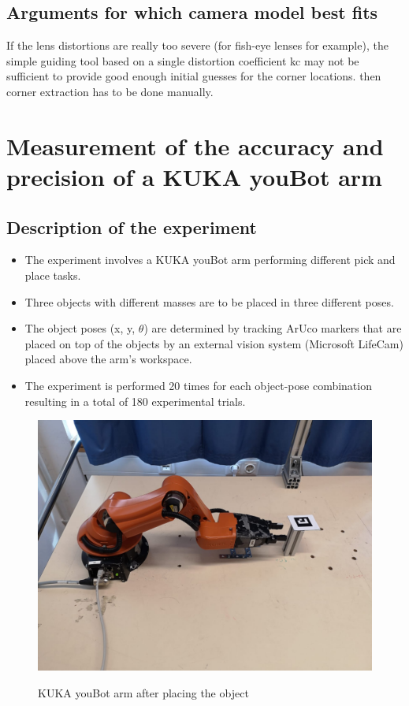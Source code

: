 \documentclass[11pt,a4paper]{article}
\begin{document}
				
				\subsection{Arguments for which camera model best fits} 
				If the lens distortions are really too severe (for fish-eye lenses for example), the simple guiding tool based on a single distortion coefficient kc may not be sufficient to provide good enough initial guesses for the corner locations. then corner extraction has to be done manually.
				
				\newpage
				\section{Measurement of the accuracy and precision of a KUKA youBot arm}
				\subsection{Description of the experiment}
				\begin{itemize}
				\item The experiment involves a KUKA youBot arm performing different pick and place tasks.
				\item Three objects with different masses are to be placed in three different poses.
				\item The object poses (x, y, $\theta$) are determined by tracking ArUco markers that are placed on top of the objects by an external vision system (Microsoft LifeCam) placed above the arm's workspace.
				\item The experiment is performed 20 times for each object-pose combination resulting in a total of 180 experimental trials.
				\end{itemize}
				\begin{figure}[H]
					\centering
					\includegraphics[scale=0.2]{youbot_1}
					\label{Youbot}
					\caption{KUKA youBot arm after placing the object }
				\end{figure}
\end{document}
